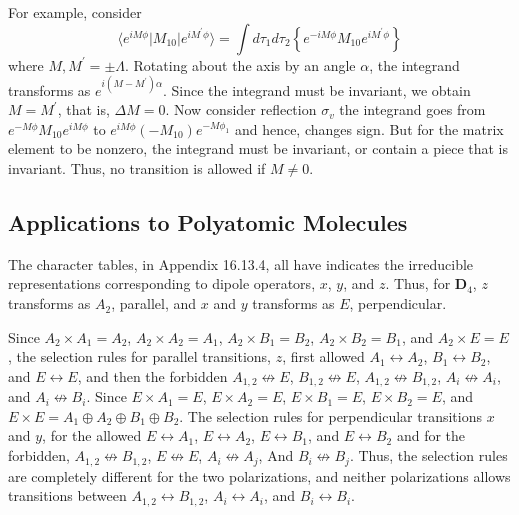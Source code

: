 For example, consider
\begin{equation}
\langle e^{iM\phi} | M_{10} | e^{iM^{\prime}\phi} \rangle = \int d 
\tau_1 d \tau_2 \left\{ e^{-iM\phi} M_{10} e^{i 
M^{\prime}\phi}\right\}
\end{equation}
where $M , M^{\prime} = \pm \Lambda$.  Rotating about the axis by an 
angle $\alpha$, the integrand transforms as 
$e^{i(M-M^{\prime})\alpha}$.  Since the integrand must be invariant, 
we obtain $M = M^{\prime}$, that is, $\Delta M = 0$.  Now consider 
reflection $\sigma_v$ the integrand goes from 
$e^{-M\phi}M_{10}e^{iM\phi}$ to $e^{iM\phi}(-M_{10})e^{-M\phi_1}$ and 
hence, changes sign.  But for the matrix element to be nonzero, the 
integrand must be invariant, or contain a piece that is invariant.  
Thus, no transition is allowed if $M \not= 0$.

\subsection{Applications to Polyatomic Molecules}

The character tables, in Appendix 16.13.4, all have indicates the 
irreducible representations corresponding to dipole operators, $x$, 
$y$, and $z$.  Thus, for {\bf D}$_4$, $z$ transforms as $A_2$, 
parallel, and $x$ and $y$ transforms as $E$, perpendicular.

Since $A_2 \times A_1 = A_2$, $A_2 \times A_2 = A_1$, $A_2 \times 
B_1 = B_2$, $A_2 \times B_2 = B_1$, and $A_2 \times E = E$, the 
selection rules for parallel transitions, $z$, first allowed $A_1 
\leftrightarrow A_2$, $B_1 \leftrightarrow B_2$, and $E 
\leftrightarrow E$, and then the forbidden $A_{1,2} 
\not\leftrightarrow E$, $B_{1,2} \not\leftrightarrow E$, $A_{1,2} 
\not\leftrightarrow B_{1,2}$, $A_i \not\leftrightarrow A_i$, and 
$A_i \not\leftrightarrow B_i$.  Since $E \times A_1 = E$, $E \times 
A_2 = E$, $E \times B_1 = E$, $E \times B_2 = E$, and $E \times E = 
A_1 \oplus A_2 \oplus B_1 \oplus B_2$.  The selection rules for 
perpendicular transitions $x$ and $y$, for the allowed $E 
\leftrightarrow A_1$, $E \leftrightarrow A_2$, $E \leftrightarrow 
B_1$, and $E \leftrightarrow B_2$ and for the forbidden, $A_{1,2} 
\not\leftrightarrow B_{1,2}$, $E \not\leftrightarrow E$, $A_i 
\not\leftrightarrow A_j$, And $B_i \not\leftrightarrow B_j$.  Thus, 
the selection rules are completely different for the two 
polarizations, and neither polarizations allows transitions between 
$A_{1,2} \leftrightarrow B_{1,2}$, $A_i \leftrightarrow A_i$, and 
$B_i \leftrightarrow B_i$. 

